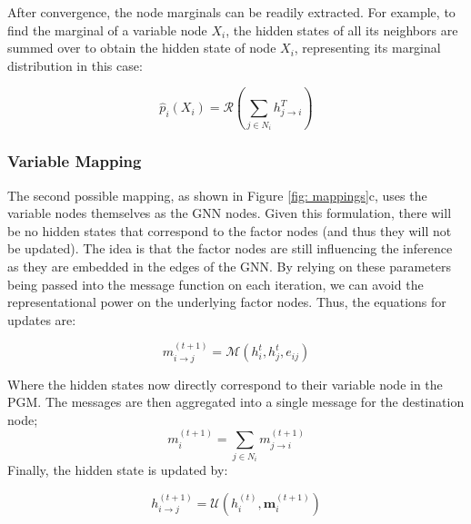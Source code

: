 \documentclass{article}
\newcommand{\anita}[1]{\textcolor{bittersweet}{[Anita : #1]}}
\newcommand{\alireza}[1]{\textcolor{orange}{[Alireza : #1]}}
\begin{document}
After convergence, the node marginals can be readily extracted. For example, to find the marginal of a variable node $X_i$, the hidden states of all its neighbors are summed over to obtain the hidden state of node $X_i$, representing its marginal distribution in this case:

\begin{equation}
    \hat{p}_i(X_i) = \mathcal{R}\left(\sum_{j \in N_i} h^{T}_{j \to i}\right)
\end{equation}
\subsubsection{Variable Mapping}

The second possible mapping, as shown in Figure \ref{fig: mappings}c, uses the variable nodes themselves as the GNN nodes. Given this formulation, there will be no hidden states that correspond to the factor nodes (and thus they will not be updated). The idea is that the factor nodes are still influencing the inference as they are embedded in the edges of the GNN. By relying on these parameters being passed into the message function on each iteration, we can avoid the representational power on the underlying factor nodes. Thus, the equations for updates are: 

\begin{equation}
m^{(t+1)}_{i \to j} = \mathcal{M}\left({h}^t_i, {h}^t_j, e_{ij}\right)
\end{equation}

Where the hidden states now directly correspond to their variable node in the PGM. The messages are then aggregated into a single message for the destination node;
\begin{equation}
    m^{(t+1)}_{i} = \sum_{j \in N_{i}} m^{(t+1)}_{j \to i}
\end{equation}
Finally, the hidden state is updated by:

\begin{equation}
    h_{i \to j}^{(t+1)} = \mathcal{U}(h_{i}^{(t)}, \bm{m}_{i}^{(t + 1)})
\end{equation}
\end{document}
